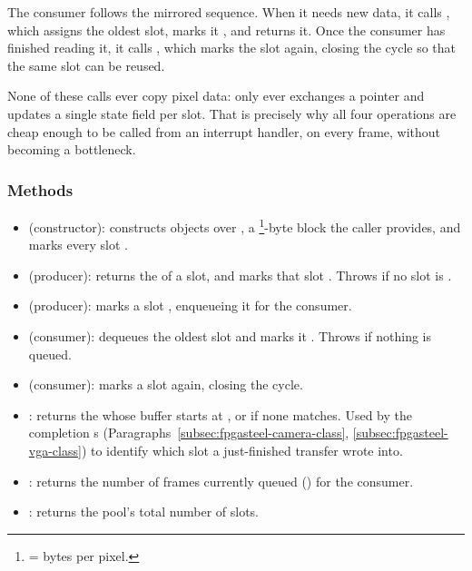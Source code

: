 The consumer follows the mirrored sequence. When it needs new data, it calls , which assigns the oldest  slot, marks it , and returns it. Once the consumer has finished reading it, it calls , which marks the slot  again, closing the cycle so that the same slot can be reused.

None of these calls ever copy pixel data:  only ever exchanges a pointer and updates a single state field per slot. That is precisely why all four operations are cheap enough to be called from an interrupt handler, on every frame, without becoming a bottleneck.

\subsubsection{Methods}

\begin{itemize}
    \item {} (constructor): constructs   objects over , a \footnote{ = bytes per pixel.}-byte block the caller provides, and marks every slot .
    \item {} (producer): returns the  of a  slot, and marks that slot . Throws  if no slot is .
    \item {} (producer): marks a  slot , enqueueing it for the consumer.
    \item {} (consumer): dequeues the oldest  slot and marks it . Throws  if nothing is queued.
    \item {} (consumer): marks a  slot  again, closing the cycle.
    \item {}: returns the  whose buffer starts at , or  if none matches. Used by the  completion s (Paragraphs~\ref{subsec:fpgasteel-camera-class}, \ref{subsec:fpgasteel-vga-class}) to identify which slot a just-finished transfer wrote into.
    \item {}: returns the number of frames currently queued () for the consumer.
    \item {}: returns the pool's total number of slots.
\end{itemize}

